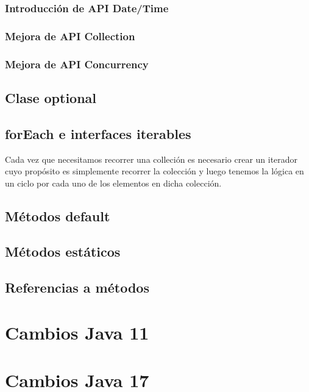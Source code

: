 \documentclass[12pt,article,oneside]{memoir}
\begin{document}
				\subsubsection{Introducci\'on de API Date/Time}
				\subsubsection{Mejora de API Collection}
				\subsubsection{Mejora de API Concurrency}
				
			\subsection{Clase optional}
			
			\subsection{forEach e interfaces iterables} 
			Cada vez que necesitamos recorrer una colleci\'on es necesario crear un iterador cuyo prop\'osito es simplemente 
			recorrer la colecci\'on y luego tenemos la l\'ogica en un ciclo por cada uno de los elementos en dicha colecci\'on.
			
			\subsection{M\'etodos default}
			
			\subsection{M\'etodos est\'aticos}
			
			\subsection{Referencias a m\'etodos}
			\newpage
	
		\section{Cambios Java 11}
		\newpage
	
		\section{Cambios Java 17}
		\newpage
			
\end{document}
